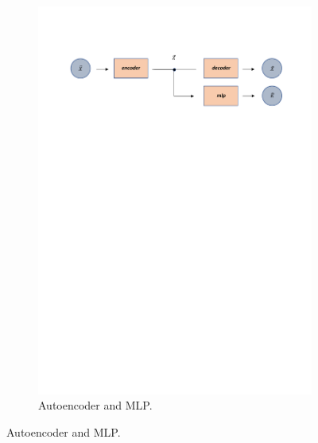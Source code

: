 \documentclass[12pt]{report}
\begin{document}
\begin{figure}[H]
\begin{subfigure}{1\linewidth}  
 \centering
  \includegraphics[width=\linewidth]{Figuras_tfg/Diagram_auto_mlp}
  \caption{Autoencoder and MLP.}
  \label{fig:FigA_Autoencoder_MLP} 
\end{subfigure}


\end{figure}
\end{document}
